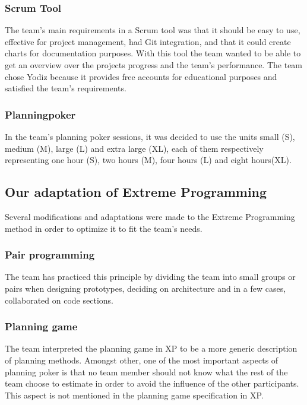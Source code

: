 \subsubsection{Scrum Tool}
The team's main requirements in a Scrum tool was that it should be easy to use, effective for project management, had Git integration, and that it could create charts for documentation purposes. With this tool the team wanted to be able to get an overview over the projects progress and the team's performance. The team chose Yodiz \cite{yodiz} because it provides free accounts for educational purposes and satisfied the team's requirements.

\subsubsection{Planningpoker}
In the team's planning poker sessions, it was decided to use the units small (S), medium (M), large (L) and extra large (XL), each of them respectively representing one hour (S), two hours (M), four hours (L) and eight hours(XL).

\subsection{Our adaptation of Extreme Programming}
Several modifications and adaptations were made to the Extreme Programming method in order to optimize it to fit the team's needs.

\subsubsection{Pair programming}
The team has practiced this principle by dividing the team into small groups or pairs when designing prototypes, deciding on architecture and in a few cases, collaborated on code sections.

\subsubsection{Planning game}
The team interpreted the planning game in XP to be a more generic description of planning methods.  Amongst other, one of the most important aspects of planning poker is that no team member should not know what the rest of the team choose to estimate in order to avoid the influence of the other participants. This aspect is not mentioned in the planning game specification in XP.

